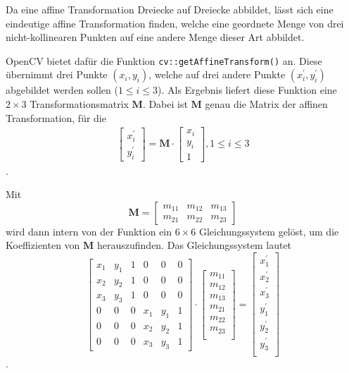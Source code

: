 \documentclass{whswinvcbook}
\begin{document}
Da eine affine Transformation Dreiecke auf Dreiecke abbildet, lässt sich eine eindeutige affine Transformation finden, welche eine geordnete Menge von drei nicht-kollinearen Punkten auf eine andere Menge dieser Art abbildet.

OpenCV bietet dafür die Funktion \texttt{cv::getAffineTransform()} an. Diese übernimmt drei Punkte $(x_i,y_i)$, welche auf drei andere Punkte $(x_i^\prime,y_i^\prime)$ abgebildet werden sollen ($1\leq i\leq3$). Als Ergebnis liefert diese Funktion eine $2\times3$ Transformationsmatrix $\mathbf{M}$. Dabei ist $\mathbf{M}$ genau die Matrix der affinen Transformation, für die 
\begin{align}
\begin{bmatrix}x_i^\prime\\y_i^\prime\end{bmatrix}=\mathbf{M}\cdot\begin{bmatrix}x_i\\y_i\\1\end{bmatrix},1\leq i\leq3 \label{eq1}
\end{align}.\cite{opencv6}

Mit $$\mathbf{M}=\begin{bmatrix}m_{11}&m_{12}&m_{13}\\m_{21}&m_{22}&m_{23}\end{bmatrix}$$ wird dann intern von der Funktion ein $6\times6$ Gleichungssystem gelöst, um die Koeffizienten von $\mathbf{M}$ herauszufinden. Das Gleichungssystem lautet $$\begin{bmatrix}x_1&y_1&1&0&0&0\\x_2&y_2&1&0&0&0\\x_3&y_3&1&0&0&0\\0&0&0&x_1&y_1&1\\0&0&0&x_2&y_2&1\\0&0&0&x_3&y_3&1\end{bmatrix}\cdot\begin{bmatrix}m_{11}\\m_{12}\\m_{13}\\m_{21}\\m_{22}\\m_{23}\\\end{bmatrix}=\begin{bmatrix}x_1^\prime\\x_2^\prime\\x_3^\prime\\y_1^\prime\\y_2^\prime\\y_3^\prime\\\end{bmatrix}$$.
\end{document}
